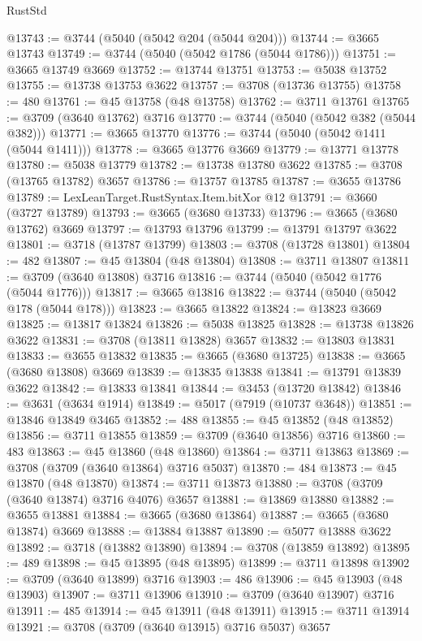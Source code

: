 \begin{lexlean}{RustStd}
\begin{coremodule}
@13743 := @3744 (@5040 (@5042 @204 (@5044 @204)))
@13744 := @3665 @13743
@13749 := @3744 (@5040 (@5042 @1786 (@5044 @1786)))
@13751 := @3665 @13749 @3669
@13752 := @13744 @13751
@13753 := @5038 @13752
@13755 := @13738 @13753 @3622
@13757 := @3708 (@13736 @13755)
@13758 := 480
@13761 := @45 @13758 (@48 @13758)
@13762 := @3711 @13761
@13765 := @3709 (@3640 @13762) @3716
@13770 := @3744 (@5040 (@5042 @382 (@5044 @382)))
@13771 := @3665 @13770
@13776 := @3744 (@5040 (@5042 @1411 (@5044 @1411)))
@13778 := @3665 @13776 @3669
@13779 := @13771 @13778
@13780 := @5038 @13779
@13782 := @13738 @13780 @3622
@13785 := @3708 (@13765 @13782) @3657
@13786 := @13757 @13785
@13787 := @3655 @13786
@13789 := LexLeanTarget.RustSyntax.Item.bitXor @12
@13791 := @3660 (@3727 @13789)
@13793 := @3665 (@3680 @13733)
@13796 := @3665 (@3680 @13762) @3669
@13797 := @13793 @13796
@13799 := @13791 @13797 @3622
@13801 := @3718 (@13787 @13799)
@13803 := @3708 (@13728 @13801)
@13804 := 482
@13807 := @45 @13804 (@48 @13804)
@13808 := @3711 @13807
@13811 := @3709 (@3640 @13808) @3716
@13816 := @3744 (@5040 (@5042 @1776 (@5044 @1776)))
@13817 := @3665 @13816
@13822 := @3744 (@5040 (@5042 @178 (@5044 @178)))
@13823 := @3665 @13822
@13824 := @13823 @3669
@13825 := @13817 @13824
@13826 := @5038 @13825
@13828 := @13738 @13826 @3622
@13831 := @3708 (@13811 @13828) @3657
@13832 := @13803 @13831
@13833 := @3655 @13832
@13835 := @3665 (@3680 @13725)
@13838 := @3665 (@3680 @13808) @3669
@13839 := @13835 @13838
@13841 := @13791 @13839 @3622
@13842 := @13833 @13841
@13844 := @3453 (@13720 @13842)
@13846 := @3631 (@3634 @1914)
@13849 := @5017 (@7919 (@10737 @3648))
@13851 := @13846 @13849 @3465
@13852 := 488
@13855 := @45 @13852 (@48 @13852)
@13856 := @3711 @13855
@13859 := @3709 (@3640 @13856) @3716
@13860 := 483
@13863 := @45 @13860 (@48 @13860)
@13864 := @3711 @13863
@13869 := @3708 (@3709 (@3640 @13864) @3716 @5037)
@13870 := 484
@13873 := @45 @13870 (@48 @13870)
@13874 := @3711 @13873
@13880 := @3708 (@3709 (@3640 @13874) @3716 @4076) @3657
@13881 := @13869 @13880
@13882 := @3655 @13881
@13884 := @3665 (@3680 @13864)
@13887 := @3665 (@3680 @13874) @3669
@13888 := @13884 @13887
@13890 := @5077 @13888 @3622
@13892 := @3718 (@13882 @13890)
@13894 := @3708 (@13859 @13892)
@13895 := 489
@13898 := @45 @13895 (@48 @13895)
@13899 := @3711 @13898
@13902 := @3709 (@3640 @13899) @3716
@13903 := 486
@13906 := @45 @13903 (@48 @13903)
@13907 := @3711 @13906
@13910 := @3709 (@3640 @13907) @3716
@13911 := 485
@13914 := @45 @13911 (@48 @13911)
@13915 := @3711 @13914
@13921 := @3708 (@3709 (@3640 @13915) @3716 @5037) @3657

\end{coremodule}
\end{lexlean}
